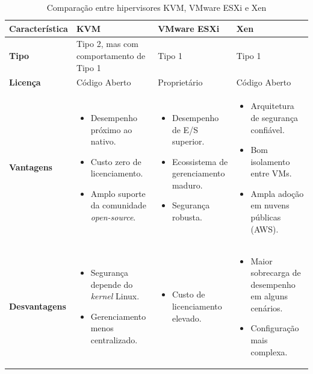 \begin{table}[htb]
    \centering
    \renewcommand{\arraystretch}{1.3}
    \caption{Comparação entre hipervisores KVM, VMware ESXi e Xen}
    \label{tab:hipervisores}
    \begin{tabularx}{\textwidth}{|>{\raggedright\arraybackslash}p{3cm}|X|X|X|}
        \hline
        \textbf{Característica} & \textbf{KVM} & \textbf{VMware ESXi} & \textbf{Xen} \\ \hline
        \textbf{Tipo} & Tipo 2, mas com comportamento de Tipo 1 & Tipo 1 & Tipo 1 \\ \hline
        \textbf{Licença} & Código Aberto & Proprietário & Código Aberto \\ \hline
        \textbf{Vantagens} &
        \begin{itemize}
            \item Desempenho próximo ao nativo.
            \item Custo zero de licenciamento.
            \item Amplo suporte da comunidade \textit{open-source}.
        \end{itemize} &
        \begin{itemize}
            \item Desempenho de E/S superior.
            \item Ecossistema de gerenciamento maduro.
            \item Segurança robusta.
        \end{itemize} &
        \begin{itemize}
            \item Arquitetura de segurança confiável.
            \item Bom isolamento entre VMs.
            \item Ampla adoção em nuvens públicas (AWS).
        \end{itemize} \\ \hline
        \textbf{Desvantagens} &
        \begin{itemize}
            \item Segurança depende do \textit{kernel} Linux.
            \item Gerenciamento menos centralizado.
        \end{itemize} &
        \begin{itemize}
            \item Custo de licenciamento elevado.
        \end{itemize} &
        \begin{itemize}
            \item Maior sobrecarga de desempenho em alguns cenários.
            \item Configuração mais complexa.
        \end{itemize} \\ \hline
    \end{tabularx}
\end{table}

